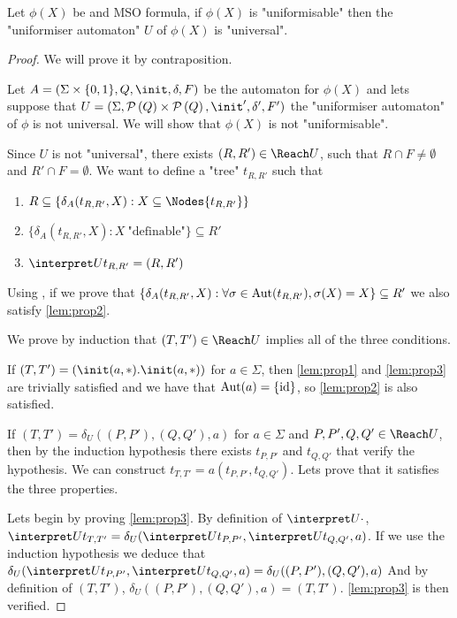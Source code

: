 \documentclass[twoside]{article}
\begin{document}
\begin{lemma}
	Let $\phi(X)$ be and MSO formula, if $\phi(X)$ is "uniformisable" then the "uniformiser automaton" $U$ of $\phi(X)$ is "universal".
\end{lemma}

\begin{proof}
	We will prove it by contraposition.

	Let $A =  (\Sigma \times \{0,1\}, Q, \init, \delta, F)$ be the automaton for $\phi(X)$ and lets suppose that
	$U = (\Sigma, \parts Q \times \parts Q,\init', \delta', F')$ the "uniformiser automaton" of $\phi$ is not universal.
	We will show that $\phi(X)$ is not "uniformisable".

	Since $U$ is not "universal", there exists $(R,R') \in \Reach U$, such that $R \cap F \neq \emptyset$ and $R' \cap F = \emptyset$.
	We want to define a "tree" $t_{R,R'}$ such that
	\begin{enumerate}
		\item $R \subseteq \{ \delta_A (t_{R,R'},X) : X \subseteq \Nodes {t_{R,R'}}\}$ \label{lem:prop1}
		\item $\{ \delta_A (t_{R,R'},X) : X \ \text{"definable"}\} \subseteq R'$\label{lem:prop2}
		\item $\interpret U {t_{R,R'}} = (R,R')$\label{lem:prop3}
	\end{enumerate}

	Using , if we prove that $\{ \delta_A (t_{R,R'},X) : \forall \sigma \in \text{Aut}(t_{R,R'}), \sigma(X) = X\} \subseteq R'$ we also
	satisfy \ref{lem:prop2}.

	We prove by induction that $(T,T') \in \Reach U$ implies all of the three conditions.

	If $(T,T') = (\init(a,*). \init (a, *))$ for $a \in \Sigma$, then \ref{lem:prop1} and \ref{lem:prop3} are trivially satisfied and we have that
	$\text{Aut} (a) = \{\text{id}\}$, so \ref{lem:prop2} is also satisfied.

	If $(T,T') = \delta_U((P,P'),(Q,Q'),a)$ for $a \in \Sigma$ and $P,P',Q,Q' \in \Reach U$, then by the induction hypothesis there exists
	$t_{P,P'}$ and $t_{Q,Q'}$ that verify the hypothesis. We can construct $t_{T,T'} = a(t_{P,P'},t_{Q,Q'})$. Lets prove that it satisfies the
	three properties.

	Lets begin by proving \ref{lem:prop3}.
	By definition of $\interpret U {\cdot}$,
	$\interpret U {t_{T,T'}} = \delta_U (\interpret U {t_{P,P'}}, \interpret U {t_{Q,Q'}}, a)$.
	If we use the induction hypothesis we deduce that
	$\delta_U (\interpret U {t_{P,P'}}, \interpret U {t_{Q,Q'}}, a) = \delta_U ((P,P'), (Q,Q'), a)$
	And by definition of $(T,T')$, $\delta_U ((P,P'), (Q,Q'), a) = (T,T')$.
	\ref{lem:prop3} is then verified.


\end{proof}
\end{document}
